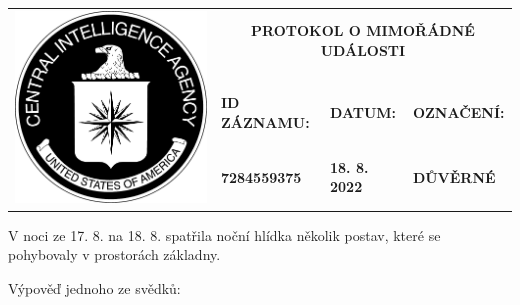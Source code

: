 \documentclass[a4paper, 11pt]{article}
\newcommand{\blackcell}{\cellcolor{black} \color{white} \ttfamily \bfseries}
\begin{document}
	\noindent
	\begin{table}[H]
		\renewcommand\tabularxcolumn[1]{m{#1}}
		\def\arraystretch{1.5}
		\begin{tabularx}{\textwidth}{l X X X}
			\multirow{4}{*}{ \includegraphics[scale=0.22]{sources/CIA_logo.pdf} } & \multicolumn{3}{c}{\bfseries \ttfamily \huge PROTOKOL O MIMOŘÁDNÉ UDÁLOSTI} \\
			&&&\\
			& \blackcell ID ZÁZNAMU: & \blackcell DATUM: & \blackcell OZNAČENÍ: \\
			& \blackcell 7284559375 & \blackcell 18. 8. 2022 & \blackcell DŮVĚRNÉ \\
		\end{tabularx}
	\end{table}

	\ttfamily

	V noci ze 17. 8. na 18. 8. spatřila noční hlídka několik postav, které se pohybovaly v prostorách základny.
	\newline
	
	\noindent
	Výpověď jednoho ze svědků:
	
		
\end{document}
